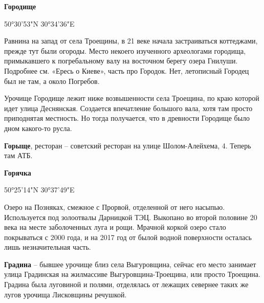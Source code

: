 \medskip


\textbf{Городище}

50°30'53"N 30°34'36"E

Равнина на запад от села Троещины, в 21 веке начала застраиваться коттеджами, прежде тут были огороды. Место некоего изученного археологами городища, примыкавшего к погребальному валу на восточном берегу озера Гнилуши. Подробнее см. «Ересь о Киеве», часть про Городок. Нет, летописный Городец был не там, а около Погребов.

Урочище Городище лежит ниже возвышенности села Троещина, по краю которой идет улица Деснянская. Создается впечатление большого вала, хотя там просто приподнятая местность. Но тогда получается, что в древности Городище было дном какого-то русла.\\

\medskip


\textbf{Горыще}, ресторан – советский ресторан на улице Шолом-Алейхема, 4. Теперь там АТБ.\\

\medskip


\textbf{Горячка}

50°25'14"N 30°37'49"E

Озеро на Позняках, смежное с Прорвой, отделенной от него насыпью. Используется под золоотвалы Дарницкой ТЭЦ. Выкопано во второй половине 20 века на месте заболоченных луга и рощи. Мрачной коркой озеро стало покрываться с 2000 года, и на 2017 год от былой водной поверхности осталась лишь незначительная часть.\\

\medskip


\textbf{Градина} – бывшее урочище близ села Выгуровщина, сейчас его место занимает улица Градинская на жилмассиве Выгуровщина-Троещина, или просто Троещина. Градина была луговиной и полями, отделялась от лежащих севернее таких же лугов урочища Лисковщины речушкой.
